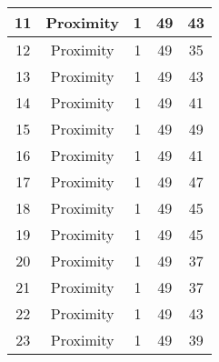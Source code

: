 \documentclass[results.tex]{subfiles}
\begin{document}
\begin{center}
\begin{tabular}{| c || c | c | c | c |}
            \hline
            11                      & Proximity                    & 1                      & 49                      & 43                   \\
            \hline
            12                      & Proximity                    & 1                      & 49                      & 35                   \\
            \hline
            13                      & Proximity                    & 1                      & 49                      & 43                   \\
            \hline
            14                      & Proximity                    & 1                      & 49                      & 41                   \\
            \hline
            15                      & Proximity                    & 1                      & 49                      & 49                   \\
            \hline
            16                      & Proximity                    & 1                      & 49                      & 41                   \\
            \hline
            17                      & Proximity                    & 1                      & 49                      & 47                   \\
            \hline
            18                      & Proximity                    & 1                      & 49                      & 45                   \\
            \hline
            19                      & Proximity                    & 1                      & 49                      & 45                   \\
            \hline
            20                      & Proximity                    & 1                      & 49                      & 37                   \\
            \hline
            21                      & Proximity                    & 1                      & 49                      & 37                   \\
            \hline
            22                      & Proximity                    & 1                      & 49                      & 43                   \\
            \hline
            23                      & Proximity                    & 1                      & 49                      & 39                   \\

\end{tabular}
\end{center}
\end{document}
